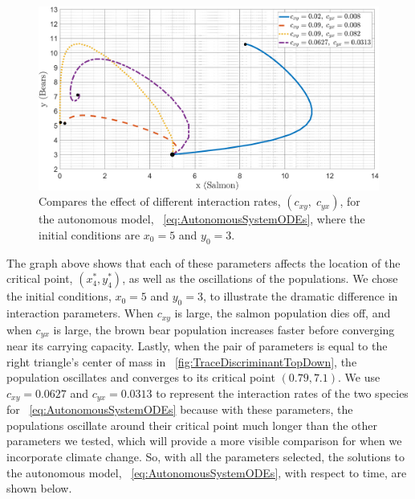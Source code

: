 \begin{figure}[H]
    \centering
    \includegraphics[width=14cm]{Pictures/Stability/SolutionsAutonomousModel.png}
    \caption{\singlespacing
    Compares the effect of different interaction rates, $(c_{xy},\;c_{yx})$, for the autonomous model, \equationautorefname~\eqref{eq:AutonomousSystemODEs}, where the initial conditions are $x_0 = 5$ and $y_0 = 3$.}
    \label{fig:SolutionsAutonomous}
\end{figure}
The graph above shows that each of these parameters affects the location of the critical point, $(x^*_4,y^*_4)$, as well as the oscillations of the populations.
We chose the initial conditions, $x_0 = 5$ and $y_0 = 3$, to illustrate the dramatic difference in interaction parameters.
When $c_{xy}$ is large, the salmon population dies off, and when $c_{yx}$ is large, the brown bear population increases faster before converging near its carrying capacity.
Lastly, when the pair of parameters is equal to the right triangle's center of mass in \figureautorefname~\ref{fig:TraceDiscriminantTopDown}, the population oscillates and converges to its critical point $(0.79,7.1)$.
We use $c_{xy}=0.0627$ and $c_{yx}=0.0313$ to represent the interaction rates of the two species for \equationautorefname~\eqref{eq:AutonomousSystemODEs} because with these parameters, the populations oscillate around their critical point much longer than the other parameters we tested, which will provide a more visible comparison for when we incorporate climate change.
So, with all the parameters selected, the solutions to the autonomous model, \equationautorefname~\eqref{eq:AutonomousSystemODEs}, with respect to time, are shown below.
